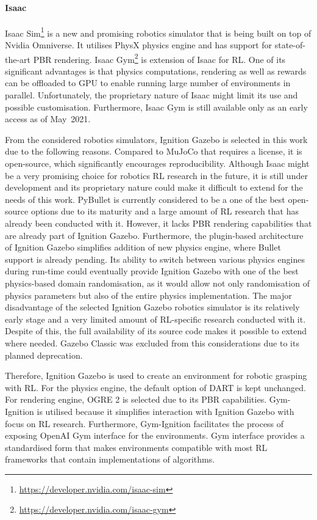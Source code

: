 \paragraph{Isaac} Isaac Sim\protect\footnote{\href{https://developer.nvidia.com/isaac-sim}{https://developer.nvidia.com/isaac-sim}} is a new and promising robotics simulator that is being built on top of Nvidia Omniverse. It utilises PhysX physics engine and has support for state-of-the-art PBR rendering. Isaac Gym\protect\footnote{\href{https://developer.nvidia.com/isaac-gym}{https://developer.nvidia.com/isaac-gym}} is extension of Isaac for RL. One of its significant advantages is that physics computations, rendering as well as rewards can be offloaded to GPU to enable running large number of environments in parallel. Unfortunately, the proprietary nature of Isaac might limit its use and possible customisation. Furthermore, Isaac Gym is still available only as an early access as of May~2021.

\bigskip

From the considered robotics simulators, Ignition Gazebo is selected in this work due to the following reasons. Compared to MuJoCo that requires a license, it is open-source, which significantly encourages reproducibility. Although Isaac might be a very promising choice for robotics RL research in the future, it is still under development and its proprietary nature could make it difficult to extend for the needs of this work. PyBullet is currently considered to be a one of the best open-source options due to its maturity and a large amount of RL research that has already been conducted with it. However, it lacks PBR rendering capabilities that are already part of Ignition Gazebo. Furthermore, the plugin-based architecture of Ignition Gazebo simplifies addition of new physics engine, where Bullet support is already pending. Its ability to switch between various physics engines during run-time could eventually provide Ignition Gazebo with one of the best physics-based domain randomisation, as it would allow not only randomisation of physics parameters but also of the entire physics implementation. The major disadvantage of the selected Ignition Gazebo robotics simulator is its relatively early stage and a very limited amount of RL-specific research conducted with it. Despite of this, the full availability of its source code makes it possible to extend where needed. Gazebo Classic was excluded from this considerations due to its planned deprecation.

Therefore, Ignition Gazebo is used to create an environment for robotic grasping with RL. For the physics engine, the default option of DART is kept unchanged. For rendering engine, OGRE 2 is selected due to its PBR capabilities. Gym-Ignition \cite{ferigo_gym-ignition_2020} is utilised because it simplifies interaction with Ignition Gazebo with focus on RL research. Furthermore, Gym-Ignition facilitates the process of exposing OpenAI Gym interface for the environments. Gym interface provides a standardised form that makes environments compatible with most RL frameworks that contain implementations of algorithms.


